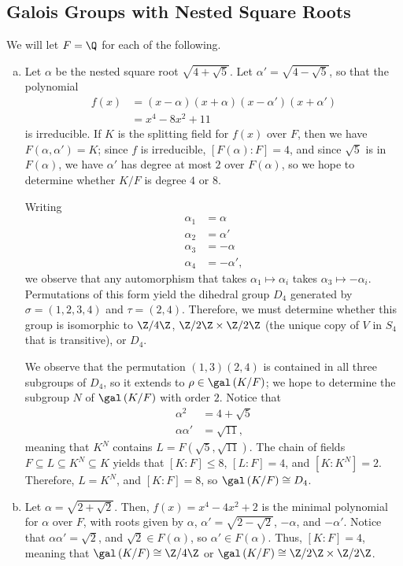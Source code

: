 \documentclass[10pt]{mypackage}
\begin{document}
\subsection{Galois Groups with Nested Square Roots}%
We will let $F = \Q$ for each of the following.
\begin{enumerate}[(a)]
  \item Let $\alpha$ be the nested square root $\sqrt{4 + \sqrt{5}}$. Let $\alpha' = \sqrt{4-\sqrt{5}}$, so that the polynomial
    \begin{align*}
      f(x) &= \left( x-\alpha \right)\left( x+\alpha \right)\left( x-\alpha' \right)\left( x+\alpha'\right)\\
           &= x^{4}-8x^2 + 11
    \end{align*}
    is irreducible. If $K$ is the splitting field for $f(x)$ over $F$, then we have $F\left( \alpha,\alpha' \right) = K$; since $f$ is irreducible, $\left[ F\left( \alpha \right):F \right] = 4$, and since $\sqrt{5}$ is in $F\left( \alpha \right)$, we have $\alpha'$ has degree at most $2$ over $F\left( \alpha \right)$, so we hope to determine whether $K/F$ is degree $4$ or $8$.

    Writing
    \begin{align*}
      \alpha_1 &= \alpha\\
      \alpha_2 &= \alpha'\\
      \alpha_3 &= -\alpha\\
      \alpha_4 &= -\alpha',
    \end{align*}
    we observe that any automorphism that takes $\alpha_1\mapsto\alpha_i$ takes $\alpha_3\mapsto -\alpha_i$. Permutations of this form yield the dihedral group $D_4$ generated by $\sigma = \left( 1,2,3,4 \right)$ and $\tau = \left( 2,4 \right)$. Therefore, we must determine whether this group is isomorphic to $\Z/4\Z$, $\Z/2\Z\times\Z/2\Z$ (the unique copy of $V$ in $S_4$ that is transitive), or $D_4$.

    We observe that the permutation $\left( 1,3 \right)\left( 2,4 \right)$ is contained in all three subgroups of $D_4$, so it extends to $\rho\in \gal\left( K/F \right)$; we hope to determine the subgroup $N$ of $\gal\left( K/F \right)$ with order $2$. Notice that
    \begin{align*}
      \alpha^2 &= 4 + \sqrt{5}\\
      \alpha\alpha' &= \sqrt{11},
    \end{align*}
    meaning that $K^{N}$ contains $L = F\left( \sqrt{5},\sqrt{11} \right)$. The chain of fields $F\subseteq L\subseteq K^{N}\subseteq K$ yields that $\left[ K:F \right]\leq 8$, $\left[ L:F \right]= 4$, and $\left[ K:K^{N} \right] = 2$. Therefore, $L = K^{N}$, and $\left[ K:F \right] = 8$, so $\gal\left( K/F \right)\cong D_4$.
  \item Let $\alpha = \sqrt{2 + \sqrt{2}}$. Then, $f(x) = x^4 - 4x^2 + 2$ is the minimal polynomial for $\alpha$ over $F$, with roots given by $\alpha$, $\alpha' = \sqrt{2-\sqrt{2}}$, $-\alpha$, and $-\alpha'$. Notice that $\alpha\alpha' = \sqrt{2}$, and $\sqrt{2}\in F\left( \alpha \right)$, so $\alpha'\in F\left( \alpha \right)$. Thus, $\left[ K:F \right] = 4$, meaning that $\gal\left( K/F \right)\cong \Z/4\Z$ or $\gal\left( K/F \right)\cong \Z/2\Z\times\Z/2\Z$.


\end{enumerate}
\end{document}

